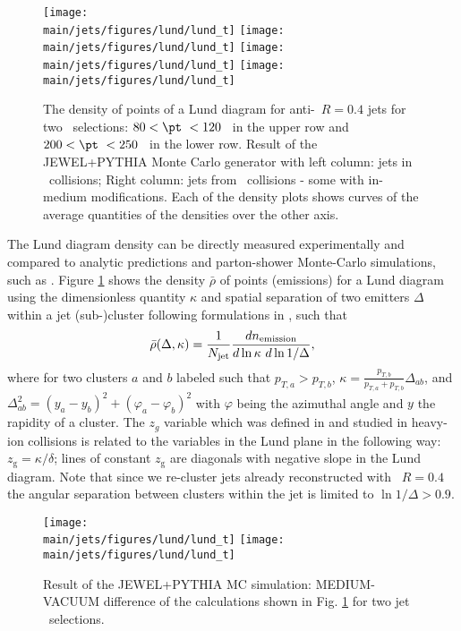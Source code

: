 \begin{figure}[htbp]
	\centering
	\texttt{[image: \\main/jets/figures/lund/lund\_t]}
	\texttt{[image: \\main/jets/figures/lund/lund\_t]}
	\texttt{[image: \\main/jets/figures/lund/lund\_t]}
	\texttt{[image: \\main/jets/figures/lund/lund\_t]}
	\caption{The density of points of a Lund diagram for anti-\kT\ $R=0.4$ jets for two \pt\ selections: $80 < \pt\ < 120$ \gevc\ in the upper row and $200 < \pt\ < 250$ \gevc\ in the lower row. Result of the JEWEL+PYTHIA Monte Carlo generator with left column: jets in \pp\ collisions; Right column: jets from \PbPb\ collisions - some with in-medium modifications. Each of the density plots shows curves of the average quantities of the densities over the other axis.}
	\label{fig:Lund_jets}
\end{figure}

The Lund diagram density can be directly measured experimentally and compared to analytic predictions and parton-shower Monte-Carlo simulations, such as \jewel.
Figure \ref{fig:Lund_jets} shows the density $\bar{\rho}$ of points (emissions) for a Lund diagram using the dimensionless quantity $\kappa$ and spatial separation of two emitters $\Delta$ within a jet (sub-)cluster following formulations in \cite{Dreyer:2018nbf}, such that
\begin{equation}
\bar{\rho}(\Delta, \kappa) = \frac{1}{N_{\rm jet}} \frac{dn_{\rm emission}}{d \ln \kappa~d \ln 1/\Delta},
\end{equation}
where for two clusters $a$ and $b$ labeled such that $p_{T,a} > p_{T,b}$, $\kappa=\frac{p_{T,b}}{p_{T,a} + p_{T,b}}\Delta_{ab}$, and $\Delta_{ab}^{2} = (y_a - y_b)^2 + (\varphi_a - \varphi_b)^2$ with $\varphi$ being the azimuthal angle and $y$ the rapidity of a cluster.
The $z_{g}$ variable which was defined in \cite{Larkoski:2015lea} and studied in heavy-ion collisions \cite{Sirunyan:2017bsd} is related to the variables in the Lund plane in the following way: $z_{\mathrm{g}} = \kappa/\delta$; lines of constant $z_\mathrm{g}$ are diagonals with negative slope in the Lund diagram. Note that since we re-cluster jets already reconstructed with \akt\ $R=0.4$ the angular separation between clusters within the jet is limited to $\ln 1/\Delta > 0.9$.

\begin{figure}[htbp]
	\centering
	\texttt{[image: \\main/jets/figures/lund/lund\_t]}
	\texttt{[image: \\main/jets/figures/lund/lund\_t]}
	\caption{Result of the JEWEL+PYTHIA MC simulation: MEDIUM-VACUUM difference of the calculations shown in Fig. \ref{fig:Lund_jets} for two jet \pt\ selections.}
	\label{fig:Lund_jets_vac_med}
\end{figure}

